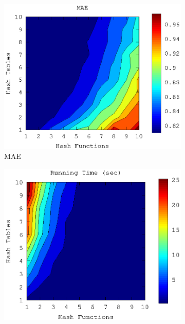 \documentclass[conference]{IEEEtran}
\begin{document}
\begin{figure}
        \begin{subfigure}[b]{0.225\textwidth}
                \includegraphics[width=\textwidth]{charts/mae-lsh-heat-map.eps}
                \caption{MAE}
                \label{fig:lsh-2d-mae}
        \end{subfigure}
        \quad
        \begin{subfigure}[b]{0.225\textwidth}
                \includegraphics[width=\textwidth]{charts/runtime-lsh-heat-map.eps}

\end{subfigure}
\end{figure}
\end{document}

